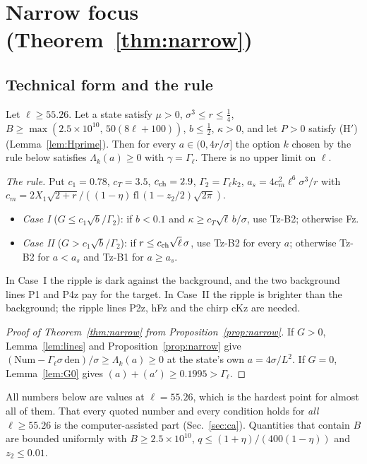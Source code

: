 \section{Narrow focus (Theorem~\ref{thm:narrow})}
\label{sec:narrow}

\subsection{Technical form and the rule}

\begin{proposition} 
\label{prop:narrow}
Let $\ell\ge55.26$.
Let a state satisfy $\mu>0$, $\sigma^3\le r\le\tfrac14$, $B\ge\max(2.5\times10^{10},\,50(8\ell+100))$, $b\le\tfrac12$, $\kappa>0$, and let $P>0$ satisfy (H$'$) (Lemma~\ref{lem:Hprime}).
Then for every $a\in(0,4r/\sigma]$ the option $k$ chosen by the rule below satisfies $\Lambda_k(a)\ge0$ with $\gamma=\Gamma_\ell$.
There is no upper limit on $\ell$.
\end{proposition}

\emph{The rule.}
Put $c_1=0.78$, $c_T=3.5$, $c_{\rm ch}=2.9$, $\Gamma_2=\Gamma_\ell k_2$, $a_s=4c_m^2\ell^6\sigma^3/r$ with $c_m=2X_1\sqrt{2+r}/((1-\eta)\,\mathrm{fl}\,(1-z_2/2)\sqrt{2\pi})$.
\begin{itemize}
\item \emph{Case I} ($G\le c_1\sqrt b/\Gamma_2$): if $b<0.1$ and $\kappa\ge c_T\sqrt\ell\,b/\sigma$, use Tz-B2; otherwise Fz.
\item \emph{Case II} ($G>c_1\sqrt b/\Gamma_2$): if $r\le c_{\rm ch}\sqrt\ell\,\sigma$, use Tz-B2 for every $a$; otherwise Tz-B2 for $a<a_s$ and Tz-B1 for $a\ge a_s$.
\end{itemize}
In Case~I the ripple is dark against the background, and the two background lines P1 and P4z pay for the target.
In Case~II the ripple is brighter than the background; the ripple lines P2z, hFz and the chirp cKz are needed.

\begin{proof}[Proof of Theorem~\ref{thm:narrow} from Proposition~\ref{prop:narrow}]
If $G>0$, Lemma~\ref{lem:lines} and Proposition~\ref{prop:narrow} give $(\mathrm{Num}-\Gamma_\ell\sigma\,\mathrm{den})/\sigma\ge\Lambda_k(a)\ge0$ at the state's own $a=4\sigma/L^2$.
If $G=0$, Lemma~\ref{lem:G0} gives $(a)+(a')\ge0.1995>\Gamma_\ell$.
\end{proof}

All numbers below are values at $\ell=55.26$, which is the hardest point for almost all of them.
That every quoted number and every condition holds for \emph{all} $\ell\ge55.26$ is the computer-assisted part (Sec.~\ref{sec:ca}).
Quantities that contain $B$ are bounded uniformly with $B\ge2.5\times10^{10}$, $q\le(1+\eta)/(400(1-\eta))$ and $z_2\le0.01$.

